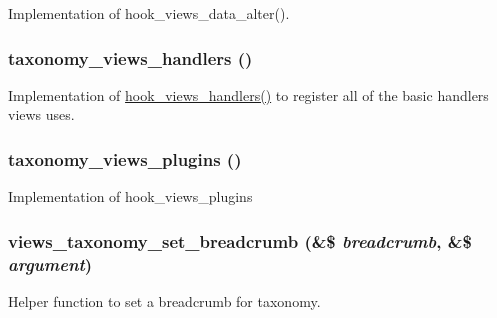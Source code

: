 Implementation of hook\_\-views\_\-data\_\-alter(). \hypertarget{group__views__taxonomy__module_gacf596f7b32d4d15da0cbb2e26e44b7b}{
\subsubsection[{taxonomy\_\-views\_\-handlers}]{\setlength{\rightskip}{0pt plus 5cm}taxonomy\_\-views\_\-handlers ()}}
\label{group__views__taxonomy__module_gacf596f7b32d4d15da0cbb2e26e44b7b}


Implementation of \hyperlink{group__views__hooks_gbf506f44bd8d8a86876f27396f5341ed}{hook\_\-views\_\-handlers()} to register all of the basic handlers views uses. \hypertarget{group__views__taxonomy__module_gdf4c4ae0f65e3a97003ca804bfff4c9c}{
\subsubsection[{taxonomy\_\-views\_\-plugins}]{\setlength{\rightskip}{0pt plus 5cm}taxonomy\_\-views\_\-plugins ()}}
\label{group__views__taxonomy__module_gdf4c4ae0f65e3a97003ca804bfff4c9c}


Implementation of hook\_\-views\_\-plugins \hypertarget{group__views__taxonomy__module_ge3ea861745bda984b3d544ac856012e0}{
\subsubsection[{views\_\-taxonomy\_\-set\_\-breadcrumb}]{\setlength{\rightskip}{0pt plus 5cm}views\_\-taxonomy\_\-set\_\-breadcrumb (\&\$ {\em breadcrumb}, \/  \&\$ {\em argument})}}
\label{group__views__taxonomy__module_ge3ea861745bda984b3d544ac856012e0}


Helper function to set a breadcrumb for taxonomy. 